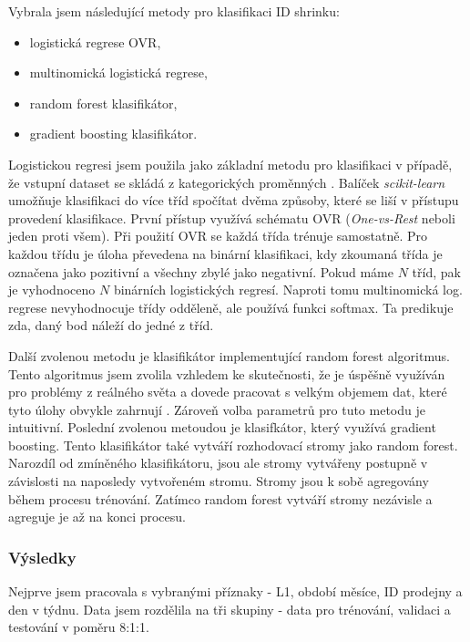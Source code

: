 Vybrala jsem následující metody pro klasifikaci ID shrinku:
\begin{itemize}
    \item logistická regrese OVR,
    \item multinomická logistická regrese,
    \item random forest klasifikátor,
    \item gradient boosting klasifikátor.
\end{itemize} 

Logistickou regresi jsem použila jako základní metodu pro klasifikaci v případě, že vstupní dataset se skládá z kategorických proměnných \cite{bib:chooseregression}. Balíček \emph{scikit-learn} umožňuje klasifikaci do více tříd spočítat dvěma způsoby, které se liší v přístupu provedení klasifikace. 
První přístup využívá schématu OVR (\emph{One-vs-Rest} neboli jeden proti všem). Při použití OVR se každá třída trénuje samostatně. Pro každou třídu je úloha převedena na binární klasifikaci, kdy zkoumaná třída je označena jako pozitivní a všechny zbylé jako negativní. Pokud máme $N$ tříd, pak je vyhodnoceno $N$ binárních logistických regresí.
Naproti tomu multinomická log. regrese nevyhodnocuje třídy odděleně, ale používá funkci softmax. Ta predikuje zda, daný bod náleží do jedné z tříd.\cite{bib:multiregression}

Další zvolenou metodu je klasifikátor implementující random forest algoritmus. Tento algoritmus jsem zvolila vzhledem ke skutečnosti, že je úspěšně využíván pro problémy z reálného světa a dovede pracovat s velkým objemem dat, které tyto úlohy obvykle zahrnují \cite{bib:rf}. Zároveň volba parametrů pro tuto metodu je intuitivní. Poslední zvolenou metoudou je klasifkátor, který využívá gradient boosting. Tento klasifikátor také vytváří rozhodovací stromy jako random forest. Narozdíl od zmíněného klasifikátoru, jsou ale stromy vytvářeny postupně v závislosti na naposledy vytvořeném stromu. Stromy jsou k sobě agregovány během procesu trénování. Zatímco random forest vytváří stromy nezávisle a agreguje je až na konci procesu.\cite{bib:rfgb}

\subsubsection{Výsledky}

Nejprve jsem pracovala s vybranými příznaky - L1, období měsíce, ID prodejny a den v týdnu.
Data jsem rozdělila na tři skupiny - data pro trénování, validaci a testování v poměru 8:1:1. 

